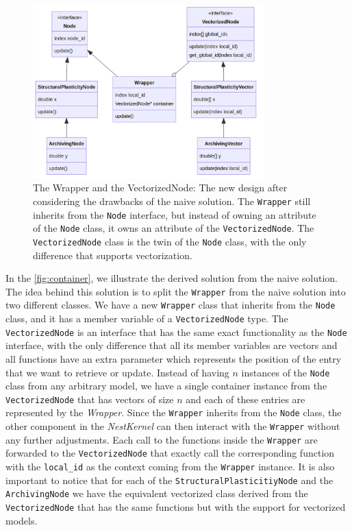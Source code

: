 \begin{figure}[h!]
\centering
\includegraphics[width=0.8\textwidth]{src/pic/wrapper_node.png}
\caption{The Wrapper and the VectorizedNode: The new design after considering the drawbacks of the naive solution. The \texttt{Wrapper} still inherits from the \texttt{Node} interface, but instead of owning an attribute of the \texttt{Node} class, it owns an attribute of the \texttt{VectorizedNode}. The \texttt{VectorizedNode} class is the twin of the \texttt{Node} class, with the only difference that supports vectorization.}
\label{fig:container}
\end{figure}

In the \autoref{fig:container}, we illustrate the derived solution from the naive solution. The idea behind this solution is to split the \texttt{Wrapper} from the naive solution into two different classes. We have a new \texttt{Wrapper} class that inherits from the \texttt{Node} class, and it has a member variable of a \texttt{VectorizedNode} type. The \texttt{VectorizedNode}  is an interface that has the same exact functionality as the \texttt{Node} interface, with the only difference that all its member variables are vectors and all functions have an extra parameter which represents the position of the entry that we want to retrieve or update. Instead of having $n$ instances of the \texttt{Node} class from any arbitrary model, we have a single container instance from  the \texttt{VectorizedNode} that has vectors of size $n$ and each of these entries are represented by the \emph{Wrapper}. Since the \texttt{Wrapper} inherits from the \texttt{Node} class, the other component in the \emph{NestKernel} can then interact with the \texttt{Wrapper} without any further adjustments. Each call to the functions inside the \texttt{Wrapper} are forwarded to the \texttt{VectorizedNode} that exactly call the corresponding function with the \texttt{local\_id} as the context coming from the \texttt{Wrapper} instance. It is also important to notice that for each of the \texttt{StructuralPlasticitiyNode} and the \texttt{ArchivingNode} we have the equivalent vectorized class derived from the \texttt{VectorizedNode} that has the same functions but with the support for vectorized models.


